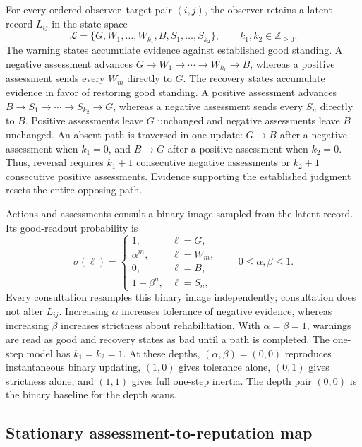 \documentclass[fleqn,10pt]{article}
\begin{document}
For every ordered observer--target pair $(i,j)$, the observer retains a latent record $L_{ij}$ in the state space
\begin{equation}
\mathcal L=\{G,W_1,\ldots,W_{k_1},B,S_1,\ldots,S_{k_2}\},
\qquad k_1,k_2\in\mathbb Z_{\geq0}.
\label{eq:methods-latent-states}
\end{equation}
The warning states accumulate evidence against established good standing. A negative assessment advances $G\to W_1\to\cdots\to W_{k_1}\to B$, whereas a positive assessment sends every $W_m$ directly to $G$. The recovery states accumulate evidence in favor of restoring good standing. A positive assessment advances $B\to S_1\to\cdots\to S_{k_2}\to G$, whereas a negative assessment sends every $S_n$ directly to $B$. Positive assessments leave $G$ unchanged and negative assessments leave $B$ unchanged. An absent path is traversed in one update: $G\to B$ after a negative assessment when $k_1=0$, and $B\to G$ after a positive assessment when $k_2=0$. Thus, reversal requires $k_1+1$ consecutive negative assessments or $k_2+1$ consecutive positive assessments. Evidence supporting the established judgment resets the entire opposing path.

Actions and assessments consult a binary image sampled from the latent record. Its good-readout probability is
\begin{equation}
\sigma(\ell)=
\begin{cases}
1,&\ell=G,\\
\alpha^m,&\ell=W_m,\\
0,&\ell=B,\\
1-\beta^n,&\ell=S_n,
\end{cases}
\qquad 0\leq\alpha,\beta\leq1.
\label{eq:methods-readout}
\end{equation}
Every consultation resamples this binary image independently; consultation does not alter $L_{ij}$. Increasing $\alpha$ increases tolerance of negative evidence, whereas increasing $\beta$ increases strictness about rehabilitation. With $\alpha=\beta=1$, warnings are read as good and recovery states as bad until a path is completed. The one-step model has $k_1=k_2=1$. At these depths, $(\alpha,\beta)=(0,0)$ reproduces instantaneous binary updating, $(1,0)$ gives tolerance alone, $(0,1)$ gives strictness alone, and $(1,1)$ gives full one-step inertia. The depth pair $(0,0)$ is the binary baseline for the depth scans.

\subsection*{Stationary assessment-to-reputation map}
\end{document}
